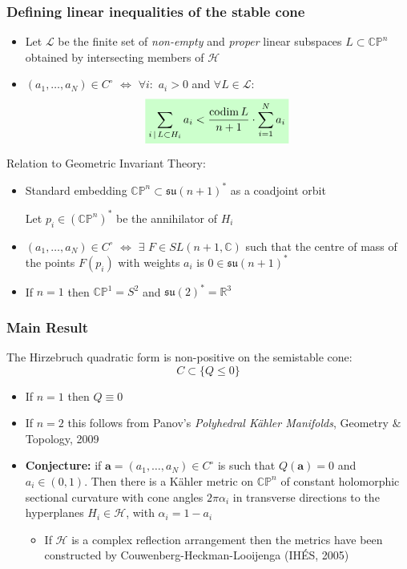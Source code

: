 \documentclass{beamer}
\newcommand{\C}{\mathbb{C}}
\newcommand{\R}{\mathbb{R}}
\newcommand{\CP}{\mathbb{CP}}
\newcommand{\mH}{\mathcal{H}}
\newcommand{\mL}{\mathcal{L}}
\newcommand{\ba}{\mathbf{a}}
\DeclareMathOperator{\codim}{codim}
\newcommand{\mathcolorbox}[2]{\colorbox{#1}{$\displaystyle #2$}}
\begin{document}
\begin{frame}
	\frametitle{Defining linear inequalities of the stable cone}
	\begin{itemize}
		\pause
		\item Let \(\mL\) be the finite set of \emph{non-empty} and \emph{proper} linear subspaces \(L \subset \CP^n\) obtained by intersecting members of \(\mH\)
		
		\pause
		\item \((a_1, \ldots, a_N) \in C^{\circ}\) \(\iff\) \(\forall i:\) \(a_i > 0\)  and \(\forall L \in \mL:\)
		\[
		\mathcolorbox{green!20}{
			\sum_{i \,|\, L \subset H_i} a_i < \frac{\codim L}{n+1} \cdot \sum_{i=1}^{N} a_i 
		}
		\]
	\end{itemize}

\pause
Relation to Geometric Invariant Theory:

\begin{itemize}
	\pause
	\item Standard embedding \(\CP^n \subset \mathfrak{su}(n+1)^*\) as a coadjoint orbit
	
	Let \(p_i \in (\CP^n)^*\) be the annihilator of \(H_i\)
	
	\pause
	\item \((a_1, \ldots, a_N) \in C^{\circ}\) \(\iff\) \(\exists\) \(F \in SL(n+1, \C)\) such that the centre of mass of the points \(F(p_i)\) with weights \(a_i\) is \(0 \in \mathfrak{su}(n+1)^*\)
	
	\pause
	\item If \(n=1\) then \(\CP^1 = S^2\) and \(\mathfrak{su}(2)^* = \R^3\)
\end{itemize}
\end{frame}


\begin{frame}
	\frametitle{Main Result}
	\pause
	\begin{theorem}
		The Hirzebruch quadratic form is non-positive on the semistable cone:
		\[
		C \subset \{Q \leq 0\}
		\]
	\end{theorem}

\begin{itemize}
	\pause
	\item If \(n=1\) then \(Q \equiv 0\)
	\pause
	\item If \(n=2\) this follows from Panov's \emph{Polyhedral K\"ahler Manifolds}, Geometry \(\&\) Topology, 2009
	\pause
	\item \textbf{Conjecture:} if \(\ba = (a_1, \ldots, a_N) \in C^{\circ}\) is such that \(Q(\ba) = 0\) and  \(a_i \in (0,1)\). Then there is a K\"ahler metric on \(\CP^n\) of constant holomorphic sectional curvature with cone angles \(2\pi\alpha_i\) in transverse directions to the hyperplanes \(H_i \in \mH\), with \(\alpha_i = 1-a_i\)
	\pause
	\begin{itemize}
		\item If \(\mH\) is a complex reflection arrangement then the metrics have been constructed by Couwenberg-Heckman-Looijenga (IH\'ES, 2005)
	\end{itemize}
\end{itemize}
\end{frame}
\end{document}
